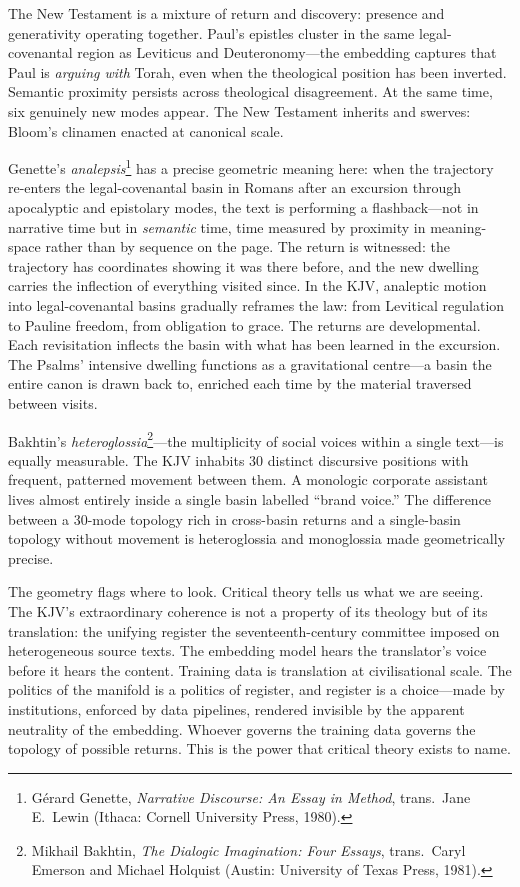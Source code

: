 The New Testament is a mixture of return and discovery: presence and generativity operating together. Paul's epistles cluster in the same legal-covenantal region as Leviticus and Deuteronomy---the embedding captures that Paul is \emph{arguing with} Torah, even when the theological position has been inverted. Semantic proximity persists across theological disagreement. At the same time, six genuinely new modes appear. The New Testament inherits and swerves: Bloom's clinamen enacted at canonical scale.

Genette's \emph{analepsis}\footnote{G\'{e}rard Genette, \emph{Narrative Discourse: An Essay in Method}, trans.\ Jane E.\ Lewin (Ithaca: Cornell University Press, 1980).} has a precise geometric meaning here: when the trajectory re-enters the legal-covenantal basin in Romans after an excursion through apocalyptic and epistolary modes, the text is performing a flashback---not in narrative time but in \emph{semantic} time, time measured by proximity in meaning-space rather than by sequence on the page. The return is witnessed: the trajectory has coordinates showing it was there before, and the new dwelling carries the inflection of everything visited since. In the KJV, analeptic motion into legal-covenantal basins gradually reframes the law: from Levitical regulation to Pauline freedom, from obligation to grace. The returns are developmental. Each revisitation inflects the basin with what has been learned in the excursion. The Psalms' intensive dwelling functions as a gravitational centre---a basin the entire canon is drawn back to, enriched each time by the material traversed between visits.

Bakhtin's \emph{heteroglossia}\footnote{Mikhail Bakhtin, \emph{The Dialogic Imagination: Four Essays}, trans.\ Caryl Emerson and Michael Holquist (Austin: University of Texas Press, 1981).}---the multiplicity of social voices within a single text---is equally measurable. The KJV inhabits 30 distinct discursive positions with frequent, patterned movement between them. A monologic corporate assistant lives almost entirely inside a single basin labelled ``brand voice.'' The difference between a 30-mode topology rich in cross-basin returns and a single-basin topology without movement is heteroglossia and monoglossia made geometrically precise.

The geometry flags where to look. Critical theory tells us what we are seeing. The KJV's extraordinary coherence is not a property of its theology but of its translation: the unifying register the seventeenth-century committee imposed on heterogeneous source texts. The embedding model hears the translator's voice before it hears the content. Training data is translation at civilisational scale. The politics of the manifold is a politics of register, and register is a choice---made by institutions, enforced by data pipelines, rendered invisible by the apparent neutrality of the embedding. Whoever governs the training data governs the topology of possible returns. This is the power that critical theory exists to name.


